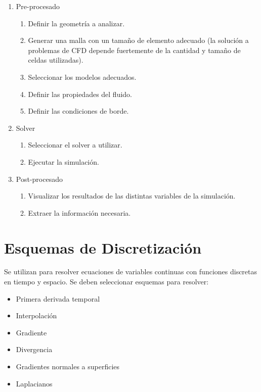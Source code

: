\begin{enumerate}
    \item Pre-procesado

        \begin{enumerate}
            \item Definir la geometría a analizar.

          \item Generar una malla con un tamaño de elemento adecuado (la
solución a problemas de CFD depende fuertemente de la cantidad y tamaño de
celdas utilizadas).
            \item Seleccionar los modelos adecuados.
            \item Definir las propiedades del fluido.
            \item Definir las condiciones de borde.

        \end{enumerate}
    \item Solver
    \begin{enumerate} \item Seleccionar el solver a utilizar.
            \item Ejecutar la simulación.
    \end{enumerate}
\item Post-procesado
    \begin{enumerate}
        \item Visualizar los resultados de las distintas variables de la
            simulación.
        \item Extraer la información necesaria.
    \end{enumerate}
\end{enumerate}


\section{Esquemas de Discretización}

Se utilizan para resolver ecuaciones de variables continuas con funciones
discretas en tiempo y espacio.
%
Se deben seleccionar esquemas para resolver:

\begin{itemize}
  \item Primera derivada temporal
  \item Interpolación
  \item Gradiente
  \item Divergencia
  \item Gradientes normales a superficies
  \item Laplacianos
\end{itemize}


